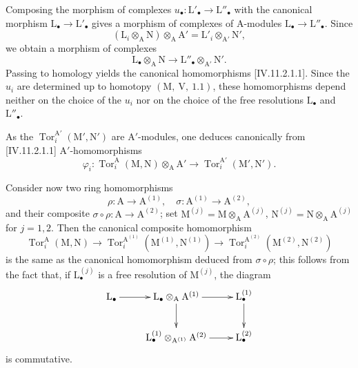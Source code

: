 Composing the morphism of complexes
$u_\bullet:\mathrm{L}'_\bullet\to\mathrm{L}''_\bullet$ with the canonical
morphism $\mathrm{L}_\bullet\to\mathrm{L}'_\bullet$ gives a morphism of
complexes of $\mathrm{A}$-modules
$\mathrm{L}_\bullet\to\mathrm{L}''_\bullet$. Since
\[
  (\mathrm{L}_i\otimes_\mathrm{A}\mathrm{N})
    \otimes_\mathrm{A}\mathrm{A}'
  =\mathrm{L}'_i\otimes_{\mathrm{A}'}\mathrm{N}',
\]
we obtain a morphism of complexes
\[
  \mathrm{L}_\bullet\otimes_\mathrm{A}\mathrm{N}
  \longrightarrow
  \mathrm{L}''_\bullet\otimes_{\mathrm{A}'}\mathrm{N}'.
\]
Passing to homology yields the canonical homomorphisms
[IV.11.2.1.1]. Since the $u_i$ are determined up to
homotopy $(\mathrm{M},~\mathrm{V},~1.1)$, these homomorphisms depend
neither on the choice of the $u_i$ nor on the choice of the free
resolutions $\mathrm{L}_\bullet$ and $\mathrm{L}''_\bullet$.

As the $\operatorname{Tor}_i^{\mathrm{A}'}(\mathrm{M}',\mathrm{N}')$ are $\mathrm{A}'$-modules, one deduces canonically from [IV.11.2.1.1] $\mathrm{A}'$-homomorphisms
\begin{equation}
  \varphi_i:\operatorname{Tor}_i^\mathrm{A}(\mathrm{M},\mathrm{N})\otimes_\mathrm{A}\mathrm{A}'\to\operatorname{Tor}_i^{\mathrm{A}'}(\mathrm{M}',\mathrm{N}').
  \tag{11.2.1.5}
\end{equation}

Consider now two ring homomorphisms
\[
  \rho:\mathrm{A}\to\mathrm{A}^{(1)},\quad \sigma:\mathrm{A}^{(1)}\to\mathrm{A}^{(2)},
\]
and their composite $\sigma\circ\rho:\mathrm{A}\to\mathrm{A}^{(2)}$; set $\mathrm{M}^{(j)}=\mathrm{M}\otimes_\mathrm{A}\mathrm{A}^{(j)}$, $\mathrm{N}^{(j)}=\mathrm{N}\otimes_\mathrm{A}\mathrm{A}^{(j)}$ for $j=1,2$. Then the canonical composite homomorphism
\[
  \operatorname{Tor}_i^\mathrm{A}(\mathrm{M},\mathrm{N})
  \longrightarrow
  \operatorname{Tor}_i^{\mathrm{A}^{(1)}}
    (\mathrm{M}^{(1)},\mathrm{N}^{(1)})
  \longrightarrow
  \operatorname{Tor}_i^{\mathrm{A}^{(2)}}
    (\mathrm{M}^{(2)},\mathrm{N}^{(2)})
\]
is the same as the canonical homomorphism deduced from $\sigma\circ\rho$; this follows from the fact that, if $\mathrm{L}_\bullet^{(j)}$ is a free resolution of $\mathrm{M}^{(j)}$, the diagram
\[
\xymatrix{
  \mathrm{L}_\bullet \ar[r] & \mathrm{L}_\bullet\otimes_\mathrm{A}\mathrm{A}^{(1)} \ar[r] \ar[d] & \mathrm{L}_\bullet^{(1)} \ar[d] \\
  & \mathrm{L}_\bullet^{(1)}\otimes_{\mathrm{A}^{(1)}}\mathrm{A}^{(2)} \ar[r] & \mathrm{L}_\bullet^{(2)}
}
\]
is commutative.

